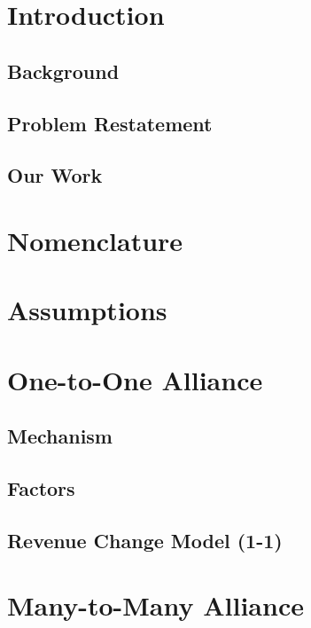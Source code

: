 


	
	
	\pagebreak
	\tableofcontents
	\thispagestyle{empty}
	\pagebreak
	
	\section{Introduction}
	\subsection{Background}
	
	\subsection{Problem Restatement}
	
	\subsection{Our Work}
	
	
	\section{Nomenclature}
	
	
	\section{Assumptions}
	
	
	\section{One-to-One Alliance}
	\subsection{Mechanism}
	
	\subsection{Factors}
	
	\subsection{Revenue Change Model (1-1)}
	
	
	\section{Many-to-Many Alliance}
